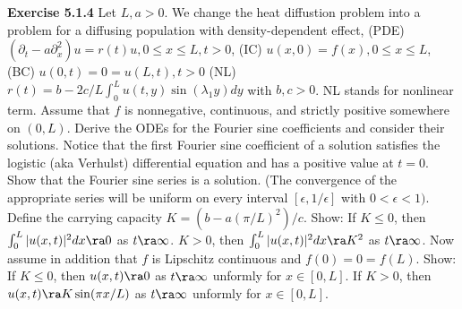 {\bf Exercise 5.1.4} Let $L, a > 0$. We change the heat diffustion problem into a problem for a diffusing population with density-dependent effect, (PDE) $(\partial_t - a \partial_x^2)u = r(t)u, 0 \leq x \leq L, t>0$, (IC) $u(x,0) = f(x), 0 \leq x \leq L$, (BC) $u(0,t) = 0 = u(L, t), t > 0$ (NL) $ r(t)=b-2c/L \int_0^L u(t,y) \sin(\lambda_1 y) dy$  with $b,c >0$. NL stands for nonlinear term. Assume that $f$ is nonnegative, continuous, and strictly positive somewhere on $(0,L)$. Derive the ODEs for the Fourier sine coefficients and consider their solutions. Notice that the first Fourier sine coefficient of a solution satisfies the logistic (aka Verhulst) differential equation and has a positive value at $t = 0$. Show that the Fourier sine series is a solution. (The convergence of the appropriate series will be uniform on every interval $[\epsilon, 1/\epsilon]$ with $0 < \epsilon < 1)$. Define the carrying capacity $K = (b-a(\pi/L)^2)/c$. Show: If $K \leq 0$, then $\int_0^L|u(x,t)|^2 dx \ra 0$ as $t \ra \infty$. $K > 0$, then $\int_0^L|u(x,t)|^2 dx \ra K^2$ as $t \ra \infty$.  Now assume in addition that $f$ is Lipschitz continuous and $f(0)=0=f(L)$. Show: If $K \leq 0$, then $u(x,t) \ra 0$ as $t \ra \infty$ unformly for $x \in [0,L]$. If $K>0$, then $u(x,t) \ra K \sin(\pi x/L)$ as $t \ra \infty$ unformly for  $x \in [0,L]$.